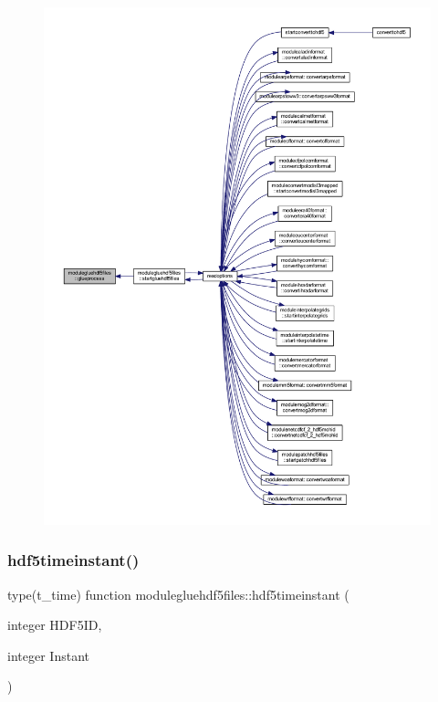 \begin{figure}[H]
\begin{center}
\leavevmode
\includegraphics[width=350pt]{namespacemodulegluehdf5files_acbfe773d67d0b68688bd5a0cf161456c_icgraph}
\end{center}
\end{figure}
\mbox{\label{namespacemodulegluehdf5files_a9a6c2b8f1c89f66fc3308854f2ab8e57}} 
\subsubsection{\texorpdfstring{hdf5timeinstant()}{hdf5timeinstant()}}
{\footnotesize\ttfamily type(t\+\_\+time) function modulegluehdf5files\+::hdf5timeinstant (\begin{DoxyParamCaption}\item[{integer}]{H\+D\+F5\+ID,  }\item[{integer}]{Instant }\end{DoxyParamCaption})\hspace{0.3cm}{\ttfamily [private]}}

